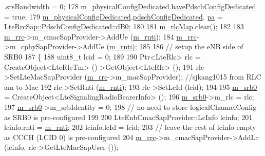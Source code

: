 \begin{DoxyCode}
      .\hyperlink{structns3_1_1LteRrcSap_1_1SoundingRsUlConfigDedicated_a6623b04421ee665595dd906ee2398648}{srsBandwidth} = 0;
178   \hyperlink{classns3_1_1UeManager_a5fca85495adcd0de6823e738094aacaf}{m\_physicalConfigDedicated}.\hyperlink{structns3_1_1LteRrcSap_1_1PhysicalConfigDedicated_adaba36198a0e653cf1536cab2833f119}{havePdschConfigDedicated} = \textcolor{keyword}{
      true};
179   \hyperlink{classns3_1_1UeManager_a5fca85495adcd0de6823e738094aacaf}{m\_physicalConfigDedicated}.\hyperlink{structns3_1_1LteRrcSap_1_1PhysicalConfigDedicated_a17e35740747a19ce9aebf834f50c2f4b}{pdschConfigDedicated}.
      \hyperlink{structns3_1_1LteRrcSap_1_1PdschConfigDedicated_aa9b1574a63fb83c53649305ca95aeb31}{pa} = \hyperlink{structns3_1_1LteRrcSap_1_1PdschConfigDedicated_ab578fcb68059ff534058eb5c67df7168ab2c88638c7d33e466151e88100a930d6}{LteRrcSap::PdschConfigDedicated::dB0};
180 
181   \hyperlink{classns3_1_1UeManager_a64f37a901db7a322552ba08d87e65770}{m\_rlcMap}.clear();
182 
183   \hyperlink{classns3_1_1UeManager_ab4405e9f354c66e7c1a4c95832290f5b}{m\_rrc}->m\_cmacSapProvider->AddUe (\hyperlink{classns3_1_1UeManager_a5a72b4fe818f21993bd7f05d7e2c4f83}{m\_rnti});
184   \hyperlink{classns3_1_1UeManager_ab4405e9f354c66e7c1a4c95832290f5b}{m\_rrc}->m\_cphySapProvider->AddUe (\hyperlink{classns3_1_1UeManager_a5a72b4fe818f21993bd7f05d7e2c4f83}{m\_rnti});
185 
186   \textcolor{comment}{// setup the eNB side of SRB0}
187   \{
188     uint8\_t lcid = 0;
189 
190     Ptr<LteRlc> rlc = CreateObject<LteRlcTm> ()->GetObject<LteRlc> ();
191     rlc->SetLteMacSapProvider (\hyperlink{classns3_1_1UeManager_ab4405e9f354c66e7c1a4c95832290f5b}{m\_rrc}->m\_macSapProvider); \textcolor{comment}{//sjkang1015 from RLC am to Mac}
192     rlc->SetRnti (\hyperlink{classns3_1_1UeManager_a5a72b4fe818f21993bd7f05d7e2c4f83}{m\_rnti});
193     rlc->SetLcId (lcid);
194 
195     \hyperlink{classns3_1_1UeManager_a8125951721a3aeefbf6ea5af111f2f3f}{m\_srb0} = CreateObject<LteSignalingRadioBearerInfo> ();
196     \hyperlink{classns3_1_1UeManager_a8125951721a3aeefbf6ea5af111f2f3f}{m\_srb0}->m\_rlc = rlc;
197     \hyperlink{classns3_1_1UeManager_a8125951721a3aeefbf6ea5af111f2f3f}{m\_srb0}->m\_srbIdentity = 0;
198     \textcolor{comment}{// no need to store logicalChannelConfig as SRB0 is pre-configured}
199 
200     LteEnbCmacSapProvider::LcInfo lcinfo;
201     lcinfo.rnti = \hyperlink{classns3_1_1UeManager_a5a72b4fe818f21993bd7f05d7e2c4f83}{m\_rnti};
202     lcinfo.lcId = lcid;
203     \textcolor{comment}{// leave the rest of lcinfo empty as CCCH (LCID 0) is pre-configured}
204     \hyperlink{classns3_1_1UeManager_ab4405e9f354c66e7c1a4c95832290f5b}{m\_rrc}->m\_cmacSapProvider->AddLc (lcinfo, rlc->GetLteMacSapUser ());

\end{DoxyCode}
